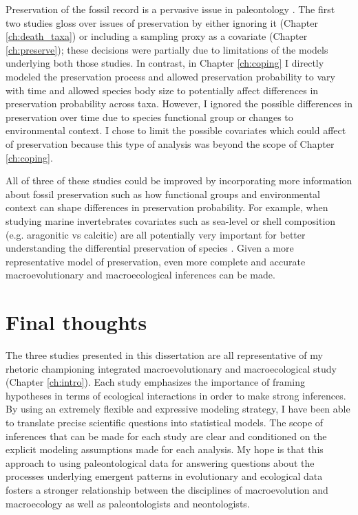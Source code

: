 Preservation of the fossil record is a pervasive issue in paleontology \citep{Foote1996e,Foote1997c,Foote1999a,Foote2001,Lloyd2011,Wang2016b}. The first two studies gloss over issues of preservation by either ignoring it (Chapter \ref{ch:death_taxa}) or including a sampling proxy as a covariate (Chapter \ref{ch:preserve}); these decisions were partially due to limitations of the models underlying both those studies. In contrast, in Chapter \ref{ch:coping} I directly modeled the preservation process and allowed preservation probability to vary with time and allowed species body size to potentially affect differences in preservation probability across taxa. However, I ignored the possible differences in preservation over time due to species functional group or changes to environmental context. I chose to limit the possible covariates which could affect of preservation because this type of analysis was beyond the scope of Chapter \ref{ch:coping}. 

All of three of these studies could be improved by incorporating more information about fossil preservation such as how functional groups and environmental context can shape differences in preservation probability. For example, when studying marine invertebrates covariates such as sea-level or shell composition (e.g. aragonitic vs calcitic) are all potentially very important for better understanding the differential preservation of species \citep{Foote2015b,Peters2002a,Peters2010,Hannisdal2011}. Given a more representative model of preservation, even more complete and accurate macroevolutionary and macroecological inferences can be made.



\section{Final thoughts}

The three studies presented in this dissertation are all representative of my rhetoric championing integrated macroevolutionary and macroecological study (Chapter \ref{ch:intro}). Each study emphasizes the importance of framing hypotheses in terms of ecological interactions in order to make strong inferences. By using an extremely flexible and expressive modeling strategy, I have been able to translate precise scientific questions into statistical models. The scope of inferences that can be made for each study are clear and conditioned on the explicit modeling assumptions made for each analysis. My hope is that this approach to using paleontological data for answering questions about the processes underlying emergent patterns in evolutionary and ecological data fosters a stronger relationship between the disciplines of macroevolution and macroecology as well as paleontologists and neontologists.

